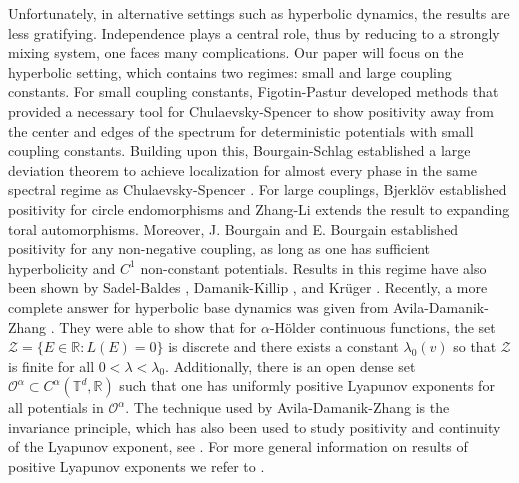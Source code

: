 \documentclass{amsart}
\newcommand{\RR}{\mathbb{R}}
\newcommand{\TT}{\mathbb{T}}
\renewcommand{\O}{\mathcal{O}}
\newcommand{\Z}{\mathcal{Z}}
\begin{document}
Unfortunately, in alternative settings such as hyperbolic dynamics, the results are less gratifying. Independence plays a central role, thus by reducing to a strongly mixing system, one faces many complications. Our paper will focus on the hyperbolic setting, which contains two regimes: small and large coupling constants. For small coupling constants, Figotin-Pastur \cite{FigPas} developed methods that provided a necessary tool for Chulaevsky-Spencer \cite{ChuSpe} to show positivity away from the center and edges of the spectrum for deterministic potentials with small coupling constants. Building upon this, Bourgain-Schlag \cite{BouSch} established a large deviation theorem to achieve localization for almost every phase in the same spectral regime as Chulaevsky-Spencer \cite{ChuSpe}. For large couplings, Bjerklöv \cite{Bje} established positivity for circle endomorphisms and Zhang-Li \cite{ZhaLi} extends the result to expanding toral automorphisms. Moreover, J. Bourgain and E. Bourgain \cite{Bou2} established positivity for any non-negative coupling, as long as one has sufficient hyperbolicity and $C^1$ non-constant potentials. Results in this regime have also been shown by Sadel-Baldes \cite{SS},  Damanik-Killip \cite{DK}, and Krüger \cite{K}. Recently, a more complete answer for hyperbolic base dynamics was given from Avila-Damanik-Zhang \cite{AvDaZh}. They were able to show that for $\alpha$-H\"older continuous functions, the set $\Z = \{E\in \RR: L(E) = 0\}$ is discrete and there exists a constant $\lambda_0(v)$ so that $\Z$ is finite for all $0 < \lambda < \lambda_0$. Additionally, there is an open dense set $\O^\alpha\subset C^\alpha(\TT^d,\RR)$ such that one has uniformly positive Lyapunov exponents for all potentials in $\O^\alpha$. The technique used by Avila-Damanik-Zhang is the invariance principle, which has also been used to study positivity and continuity of the Lyapunov exponent, see \cite{BonVia,vy}. For more general information on results of positive Lyapunov exponents we refer to \cite{WanZha}. 
\end{document}
